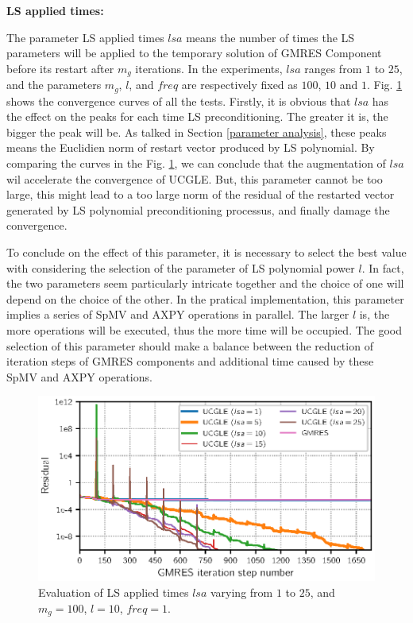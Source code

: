 \textbf{LS applied times: }

The parameter LS applied times $lsa$ means the number of times the LS parameters will be applied to the temporary solution of GMRES Component before its restart after $m_g$ iterations. In the experiments, $lsa$ ranges from $1$ to $25$, and the parameters $m_g$, $l$, and $freq$ are respectively fixed as $100$, $10$ and $1$. Fig. \ref{fig:Lsappliedtime} shows the convergence curves of all the tests. Firstly, it is obvious that $lsa$ has the effect on the peaks for each time LS preconditioning. The greater it is, the bigger the peak will be. As talked in Section \ref{parameter analysis}, these peaks means the Euclidien norm of restart vector produced by LS polynomial. By comparing the curves in  the Fig. \ref{fig:Lsappliedtime}, we can conclude that the augmentation of $lsa$ wil accelerate the convergence of UCGLE. But, this parameter cannot be too large, this might lead to a too large norm of the residual of the restarted vector generated by LS polynomial preconditioning processus, and finally damage the convergence.

To conclude on the effect of this parameter, it is necessary to select the best value with considering the selection of the parameter of LS polynomial power $l$. In fact, the two parameters seem particularly intricate together and the choice of one will depend on the choice of the other. In the pratical implementation, this parameter implies a series of SpMV and AXPY operations in parallel. The larger $l$ is, the more operations will be executed, thus the more time will be occupied. The good selection of this parameter should make a balance between the reduction of iteration steps of GMRES components and additional time caused by these SpMV and AXPY operations.

\begin{figure}[htbp]
	\centering
	\includegraphics[width=6.2in]{fig/conv_lsappied.eps}
	\caption{Evaluation of LS applied times $lsa$ varying from $1$ to $25$, and $m_g=100$, $l=10$, $freq=1$. }
	\label{fig:Lsappliedtime}
\end{figure}


